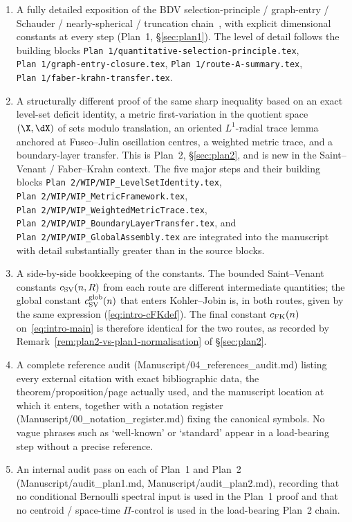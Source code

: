 \begin{enumerate}
\item A fully detailed exposition of the BDV
selection-principle / graph-entry / Schauder / nearly-spherical /
truncation chain~\cite{BDV,Brasco2014}, with explicit dimensional
constants at every step (Plan~1, \S\ref{sec:plan1}). The level of
detail follows the building blocks
\texttt{Plan~1/quantitative-selection-principle.tex},
\texttt{Plan~1/graph-entry-closure.tex},
\texttt{Plan~1/route-A-summary.tex},
\texttt{Plan~1/faber-krahn-transfer.tex}.
\item A structurally different proof of the same sharp inequality
based on an exact level-set deficit identity, a metric first-variation
in the quotient space $(\X,\dX)$ of sets modulo translation, an
oriented $L^1$-radial trace lemma anchored at Fusco--Julin oscillation
centres, a weighted metric trace, and a boundary-layer transfer. This
is Plan~2, \S\ref{sec:plan2}, and is new in the Saint--Venant /
Faber--Krahn context. The five major steps and their building blocks
\texttt{Plan~2/WIP/WIP\_LevelSetIdentity.tex},
\texttt{Plan~2/WIP/WIP\_MetricFramework.tex},
\texttt{Plan~2/WIP/WIP\_WeightedMetricTrace.tex},
\texttt{Plan~2/WIP/WIP\_BoundaryLayerTransfer.tex}, and
\texttt{Plan~2/WIP/WIP\_GlobalAssembly.tex} are integrated into the
manuscript with detail substantially greater than in the source
blocks.
\item A side-by-side bookkeeping of the constants. The bounded
Saint--Venant constants $c_{\rm SV}(n,R)$ from each route are
different intermediate quantities; the global constant
$c_{\rm SV}^{\rm glob}(n)$ that enters Kohler--Jobin is, in both
routes, given by the same expression
(\eqref{eq:intro-cFKdef}). The final constant $c_{\rm FK}(n)$
on~\eqref{eq:intro-main} is therefore identical for the two routes,
as recorded by Remark~\ref{rem:plan2-vs-plan1-normalisation} of
\S\ref{sec:plan2}.
\item A complete reference audit
(Manuscript/04\_references\_audit.md) listing every external citation
with exact bibliographic data, the theorem/proposition/page actually
used, and the manuscript location at which it enters, together with a
notation register (Manuscript/00\_notation\_register.md) fixing the
canonical symbols. No vague phrases such as `well-known' or
`standard' appear in a load-bearing step without a precise reference.
\item An internal audit pass on each of Plan~1 and Plan~2
(Manuscript/audit\_plan1.md, Manuscript/audit\_plan2.md), recording
that no conditional Bernoulli spectral input is used in the Plan~1
proof and that no centroid / space-time $\Pi$-control is used in the
load-bearing Plan~2 chain.
\end{enumerate}

